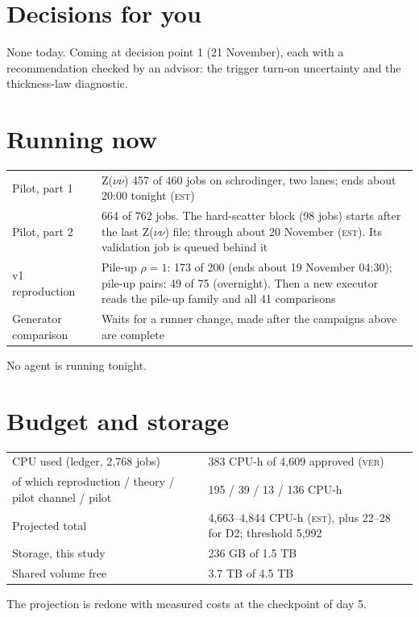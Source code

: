 \documentclass[11pt,a4paper]{article}
\newcommand{\est}{\textsc{est}}
\newcommand{\ver}{\textsc{ver}}
\begin{document}
\section{Decisions for you}
None today. Coming at decision point 1 (21 November), each with a recommendation checked by an advisor:
the trigger turn-on uncertainty and the thickness-law diagnostic.

\section{Running now}
\begin{center}
\begin{tabular}{L{3.6cm}L{10.6cm}}
\toprule
Pilot, part 1 & Z($\nu\nu$) 457 of 460 jobs on schrodinger, two lanes; ends about 20:00 tonight (\est) \\
Pilot, part 2 & 664 of 762 jobs. The hard-scatter block (98 jobs) starts after the last Z($\nu\nu$) file;
                through about 20 November (\est). Its validation job is queued behind it \\
v1 reproduction & Pile-up $\rho=1$: 173 of 200 (ends about 19 November 04:30); pile-up pairs: 49 of 75
                (overnight). Then a new executor reads the pile-up family and all 41 comparisons \\
Generator comparison & Waits for a runner change, made after the campaigns above are complete \\
\bottomrule
\end{tabular}
\end{center}
No agent is running tonight.

\section{Budget and storage}
\begin{center}
\begin{tabular}{L{7.6cm}L{6.4cm}}
\toprule
CPU used (ledger, 2{,}768 jobs) & 383 CPU-h of 4{,}609 approved (\ver) \\
\quad of which reproduction / theory / pilot channel / pilot & 195 / 39 / 13 / 136 CPU-h \\
Projected total & 4{,}663--4{,}844 CPU-h (\est), plus 22--28 for D2; threshold 5{,}992 \\
Storage, this study & 236 GB of 1.5 TB \\
Shared volume free & 3.7 TB of 4.5 TB \\
\bottomrule
\end{tabular}
\end{center}
The projection is redone with measured costs at the checkpoint of day 5.
\end{document}

